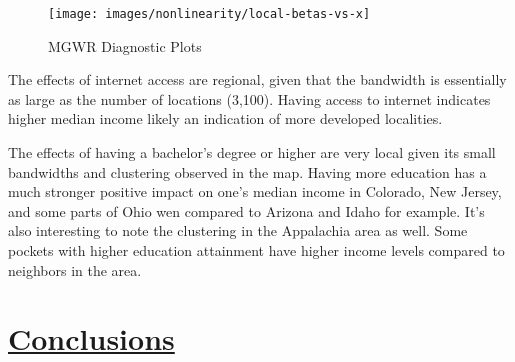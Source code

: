 \documentclass[
]{article}
\begin{document}
\begin{table}[H]
\renewcommand{\arraystretch}{1.3} %
\setlength{\tabcolsep}{12pt} %
\centering
\caption{MGWR Residual Moran's I Test Results}
\label{tab:mgwr_morans_i}
\end{table}

\begin{figure}[H]

{\centering \texttt{[image: images/nonlinearity/local-betas-vs-x]} 

}

\caption{MGWR Diagnostic Plots}\label{fig:unnamed-chunk-10}
\end{figure}

\newpage

The effects of internet access are regional, given that the bandwidth is
essentially as large as the number of locations (3,100). Having access
to internet indicates higher median income likely an indication of more
developed localities.

The effects of having a bachelor's degree or higher are very local given
its small bandwidths and clustering observed in the map. Having more
education has a much stronger positive impact on one's median income in
Colorado, New Jersey, and some parts of Ohio wen compared to Arizona and
Idaho for example. It's also interesting to note the clustering in the
Appalachia area as well. Some pockets with higher education attainment
have higher income levels compared to neighbors in the area.

\newpage

\section{\texorpdfstring{\ul{Conclusions}}{Conclusions}}\label{conclusions}
\end{document}

